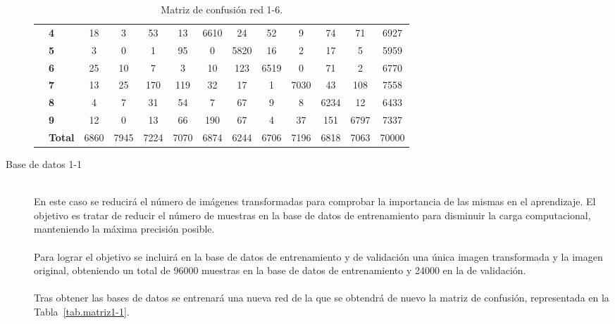 \begin{description}
\begin{table}[H]
\begin{tabular}{|c|l|c|c|c|c|c|c|c|c|c|c|c|}
			& \textbf{4} & 18 & 3 & 53 & 13 & \cellcolor{lightgray}6610 & 24 & 52 & 9 & 74 & 71 & 6927\\ \cline{2-13}
			& \textbf{5} & 3 & 0 & 1 & 95 & 0 & \cellcolor{lightgray}5820 & 16 & 2 & 17 & 5 &5959\\ \cline{2-13}
			& \textbf{6} & 25 & 10 & 7 & 3 & 10 & 123 & \cellcolor{lightgray}6519 & 0 & 71 & 2 & 6770\\ \cline{2-13}
			& \textbf{7} & 13 & 25 & 170 & 119 & 32 & 17 & 1 & \cellcolor{lightgray}7030 & 43 & 108 & 7558\\ \cline{2-13}
			& \textbf{8} & 4 & 7 & 31 & 54 & 7 & 67 & 9 & 8 & \cellcolor{lightgray}6234 & 12 & 6433\\ \cline{2-13}
			& \textbf{9} & 12 & 0 & 13 & 66 & 190 & 67 & 4 & 37 & 151 & \cellcolor{lightgray}6797 & 7337\\ \cline{2-13}
			& \textbf{Total} & 6860 & 7945 & 7224 & 7070 & 6874 & 6244 & 6706 & 7196 & 6818 & 7063 & 70000\\ \hline
		\end{tabular}
		\caption{Matriz de confusión red 1-6.}
		\label{tab.matriz1-6}
	\end{table}
	\vspace{10pt}
	\item[Base de datos 1-1] \hfill 
	\vspace{10pt}
	\\
	En este caso se reducirá el número de imágenes transformadas para comprobar la importancia de las mismas en el aprendizaje. El objetivo es tratar de reducir el número de muestras en la base de datos de entrenamiento para disminuir la carga computacional, manteniendo la máxima precisión posible.\\
	\vspace{-10pt}
	\\
	Para lograr el objetivo se incluirá en la base de datos de entrenamiento y de validación una única imagen transformada y la imagen original, obteniendo un total de 96000 muestras en la base de datos de entrenamiento y 24000 en la de validación.\\
	\vspace{-10pt}
	\\
	Tras obtener las bases de datos se entrenará una nueva red de la que se obtendrá de nuevo la matriz de confusión, representada en la Tabla~\ref{tab.matriz1-1}.
	\begin{table}[H]
		\centering
		\begin{tabular}{|c|l|c|c|c|c|c|c|c|c|c|c|c|}
			\cline{3-13} 

\end{tabular}
\end{table}
\end{description}

